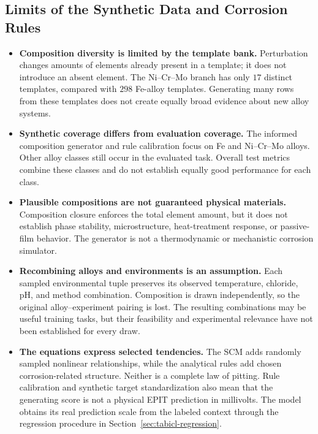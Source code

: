 \documentclass[11pt]{article}
\newenvironment{notes}
  {\begin{itemize}\setlength{\itemsep}{0.45em}\setlength{\parsep}{0pt}}
  {\end{itemize}}
\begin{document}
\subsection{Limits of the Synthetic Data and Corrosion Rules}
\label{sec:physical-limitations}

\begin{notes}
    \item \textbf{Composition diversity is limited by the template bank.}
    Perturbation changes amounts of elements already present
    in a template; it does not introduce an absent element.
    The Ni--Cr--Mo branch has only \(17\) distinct templates,
    compared with \(298\) Fe-alloy templates.
    Generating many rows from these templates does not
    create equally broad evidence about new alloy systems.

    \item \textbf{Synthetic coverage differs from evaluation coverage.}
    The informed composition generator and rule calibration
    focus on Fe and Ni--Cr--Mo alloys.
    Other alloy classes still occur in the evaluated task.
    Overall test metrics combine these classes and do not
    establish equally good performance for each class.

    \item \textbf{Plausible compositions are not guaranteed physical materials.}
    Composition closure enforces the total element amount,
    but it does not establish phase stability, microstructure,
    heat-treatment response, or passive-film behavior.
    The generator is not a thermodynamic or mechanistic
    corrosion simulator.

    \item \textbf{Recombining alloys and environments is an assumption.}
    Each sampled environmental tuple preserves its observed
    temperature, chloride, pH, and method combination.
    Composition is drawn independently, so the original
    alloy--experiment pairing is lost.
    The resulting combinations may be useful training tasks,
    but their feasibility and experimental relevance have
    not been established for every draw.

    \item \textbf{The equations express selected tendencies.}
    The SCM adds randomly sampled nonlinear relationships,
    while the analytical rules add chosen corrosion-related
    structure. Neither is a complete law of pitting.
    Rule calibration and synthetic target standardization
    also mean that the generating score is not a physical
    EPIT prediction in millivolts.
    The model obtains its real prediction scale from the
    labeled context through the regression procedure in
    Section~\ref{sec:tabicl-regression}.
\end{notes}
\end{document}
